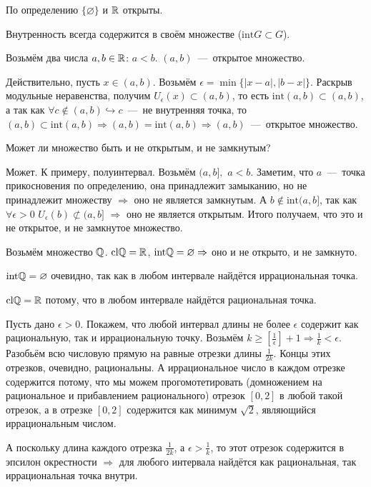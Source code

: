 \begin{note}
    По определению $\{ \varnothing \}$ и $\mathbb{R}$ открыты.
\end{note}
\begin{note}
    Внутренность всегда содержится в своём множестве ($\text{int}G \subset G$).
\end{note}
\begin{example}
    Возьмём два числа $a, b \in \mathbb{R}$: $a < b$. $( a, b )$~---~открытое множество.

    Действительно, пусть $x \in (a, b)$. Возьмём $\epsilon = \min \{ |x - a|, |b - x| \}$. Раскрыв модульные неравенства, получим $U_{\epsilon} (x) \subset (a, b)$, то есть $\text{int}(a, b) \subset (a, b)$, а так как $\forall c \notin (a, b) \hookrightarrow c$~---~не внутренняя точка, то $(a, b) \subset \text{int}(a, b) \Rightarrow (a, b) = \text{int}(a, b) \Rightarrow (a, b)$~---~открытое множество.
\end{example}
\begin{problem}
    Может ли множество быть и не открытым, и не замкнутым?
\end{problem}
\begin{solution}
    Может. К примеру, полуинтервал. Возьмём $(a , b ],$ $a < b$. Заметим, что $a$~---~точка прикосновения по определению, она принадлежит замыканию, но не принадлежит множеству $\Rightarrow$ оно не является замкнутым. А $b \notin \text{int}(a, b]$, так как $\forall \epsilon > 0$ $U_{\epsilon} (b) \not\subset (a, b]$ $\Rightarrow$ оно не является открытым. Итого получаем, что это и не открытое, и не замкнутое множество.
\end{solution}
\begin{example}
    Возьмём множество $\mathbb{Q}$. $\text{cl}\mathbb{Q} = \mathbb{R}$, $\text{int}\mathbb{Q} = \varnothing \Rightarrow$ оно и не открыто, и не замкнуто.

    $\text{int}\mathbb{Q} = \varnothing$ очевидно, так как в любом интервале найдётся иррациональная точка.

    $\text{cl}\mathbb{Q} = \mathbb{R}$ потому, что в любом интервале найдётся рациональная точка.

    Пусть дано $\epsilon > 0$. Покажем, что любой интервал длины не более $\epsilon$ содержит как рациональную, так и иррациональную точку. Возьмём $k \geq [\frac{1}{\epsilon}] + 1 \Rightarrow \frac{1}{k} < \epsilon$. Разобьём всю числовую прямую на равные отрезки длины $\frac{1}{2k}$. Концы этих отрезков, очевидно, рациональны. А иррациональное число в каждом отрезке содержится потому, что мы можем прогомотетировать (домножением на рациональное и прибавлением рационального) отрезок $[ 0, 2 ]$ в любой такой отрезок, а в отрезке $[ 0, 2 ]$ содержится как минимум $\sqrt{2}$, являющийся иррациональным числом.

    А поскольку длина каждого отрезка $\frac{1}{2k}$, а $\epsilon > \frac{1}{k}$, то этот отрезок содержится в эпсилон окрестности $\Rightarrow$ для любого интервала найдётся как рациональная, так иррациональная точка внутри.
\end{example}
